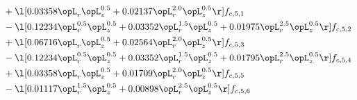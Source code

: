 \begin{alignat}{2}
& + \l[  0.03358 \opL_r \opL_z^{0.5} +  0.02137 \opL_r^{2.0} \opL_z^{0.5}  \r] f_{c,5,1} \nonumber \\ 
& - \l[  0.12234 \opL_r^{0.5} \opL_z^{0.5} +  0.03352 \opL_r^{1.5} \opL_z^{0.5} +  0.01975 \opL_r^{2.5} \opL_z^{0.5}  \r] f_{c,5,2} \nonumber \\ 
& + \l[  0.06716 \opL_r \opL_z^{0.5} +  0.02564 \opL_r^{2.0} \opL_z^{0.5}  \r] f_{c,5,3} \nonumber \\ 
& - \l[  0.12234 \opL_r^{0.5} \opL_z^{0.5} +  0.03352 \opL_r^{1.5} \opL_z^{0.5} +  0.01795 \opL_r^{2.5} \opL_z^{0.5}  \r] f_{c,5,4} \nonumber \\ 
& + \l[  0.03358 \opL_r \opL_z^{0.5} +  0.01709 \opL_r^{2.0} \opL_z^{0.5}  \r] f_{c,5,5} \nonumber \\ 
& - \l[  0.01117 \opL_r^{1.5} \opL_z^{0.5} +  0.00898 \opL_r^{2.5} \opL_z^{0.5}  \r] f_{c,5,6} \nonumber \\ 
\end{alignat} 


